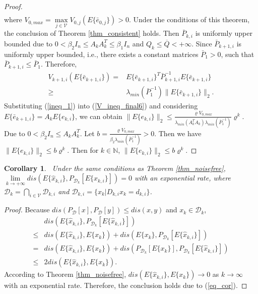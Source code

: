 \documentclass[journal,transmag]{IEEEtran}
\newtheorem{corollary}{\textbf{Corollary}}
\begin{document}
{\begin{proof}
\begin{align}
			\end{align}
		where $V_{0,max}=\max\limits_{j\in\mathcal{V}}V_{0,j}(E\{\bar e_{0,j}\})>0$.	
	Under the conditions of this theorem, the conclusion of Theorem \ref{thm_consistent} holds. 
	Then  $\bar P_{k,i}$ is uniformly upper bounded due to $0<\beta_{2}I_n\leq A_{k}A_{k}^T\leq\beta_{1}I_n$ and  $Q_{k}\leq \overline Q<+\infty$. 
	Since $\bar P_{k+1,i}$ is uniformly upper bounded, i.e., there exists a constant matrices $\bar P_1>0$, such that $\bar P_{k+1,i}\leq \bar P_1.$
	Therefore,
	\begin{align}\label{ineq_1}
	V_{k+1,i}(E\{\bar e_{k+1,i}\})
	=& E\{\bar e_{k+1,i}\}^T\bar P_{k+1,i}^{-1}E\{\bar e_{k+1,i}\}\nonumber\\
	\geq& \lambda_{min}(\bar P_{1}^{-1})\|E\{\bar e_{k+1,i}\}\|_2.
	\end{align}	
	Substituting (\ref{ineq_1}) into (\ref{V_ineq_final6}) and considering  $E\{\bar e_{k+1,i}\}=A_{k}E\{e_{k,i}\}$, we can obtain
	$\|E\{e_{k,i}\}\|_2\leq \frac{ \varrho V_{0,max}}{\lambda_{min}(A_{k}^TA_{k})\lambda_{min}(\bar P_{1}^{-1})}\varrho^{k}.$
	Due to $0<\beta_{2}I_n\leq A_{k}A_{k}^T$. Let $b=\frac{\varrho V_{0,max}}{\beta_{2}\lambda_{min}(\bar P_{1}^{-1})}>0$. Then  we have $\|E\{e_{k,i}\}\|_2\leq  b\varrho^k.$ Then for $k\in\mathbb{N}$,
	$\|E\{e_{k,i}\}\|_2\leq b\varrho^k$.
\end{proof}	
\begin{corollary}\label{cor_pro}
	{\
	Under the same conditions as Theorem \ref{thm_noisefree}, $\lim\limits_{k\rightarrow +\infty} dis(E\{\hat x_{k,i}\},P_{\mathcal{D}_{k}}[E\{\hat x_{k,i}\}])=0$ with an exponential rate, where $\mathcal{D}_{k}=\bigcap_{i\in\mathcal{V}} \mathcal{D}_{k,i}$ and $\mathcal{D}_{k,i}=\{x_k|D_{k,i}x_k=d_{k,i}\}$.
	}
\end{corollary}
\begin{proof}
	Because $dis(P_{\mathcal{D}}[x],P_{\mathcal{D}}[y])\leq dis(x,y)$ \cite{lou2013convergence} and  $x_{k}\in\mathcal{D}_{k}$, 
	\begin{align}
	&dis(E\{\hat x_{k,i}\},P_{\mathcal{D}_{k}}[E\{\hat x_{k,i}\}])\nonumber\\
	\leq& dis(E\{\hat x_{k,i}\},E\{x_k\})+dis(E\{x_k\},P_{\mathcal{D}_{k}}[E\{\hat x_{k,i}\}])\nonumber\\
	= &dis(E\{\hat x_{k,i}\},E\{x_k\})+dis(P_{\mathcal{D}_{k}}[E\{x_k\}],P_{\mathcal{D}_{k}}[E\{\hat x_{k,i}\}])\nonumber\\
	\leq& 2dis(E\{\hat x_{k,i}\},E\{x_k\}).\label{eq_cor}
	\end{align}
According to Theorem \ref{thm_noisefree}, $dis(E\{\hat x_{k,i}\},E\{x_k\})\rightarrow 0$ as $k\rightarrow\infty$ with an exponential rate. Therefore, the conclusion holds due to (\ref{eq_cor}).
\end{proof}

}
\end{document}
